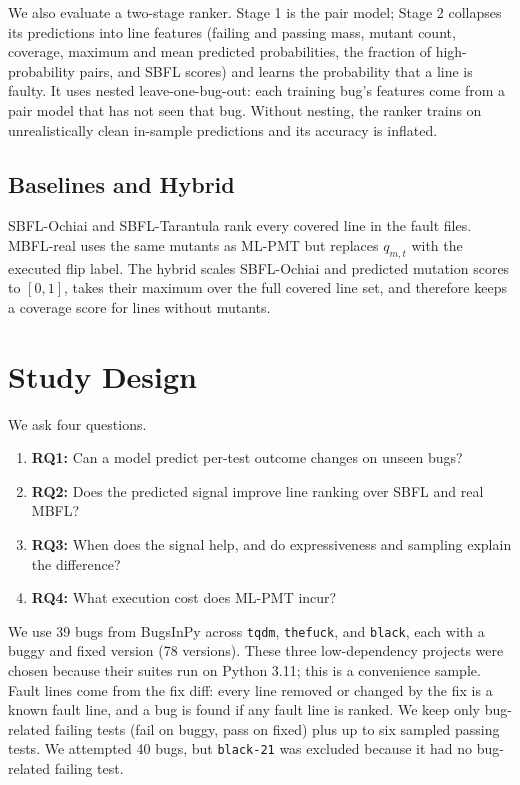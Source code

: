 \documentclass[10pt,conference]{IEEEtran}
\begin{document}
We also evaluate a two-stage ranker. Stage 1 is the pair model; Stage 2 collapses its predictions into line features (failing and passing mass, mutant count, coverage, maximum and mean predicted probabilities, the fraction of high-probability pairs, and SBFL scores) and learns the probability that a line is faulty. It uses nested leave-one-bug-out: each training bug's features come from a pair model that has not seen that bug. Without nesting, the ranker trains on unrealistically clean in-sample predictions and its accuracy is inflated.

\subsection{Baselines and Hybrid}

SBFL-Ochiai and SBFL-Tarantula rank every covered line in the fault files. MBFL-real uses the same mutants as ML-PMT but replaces $q_{m,t}$ with the executed flip label. The hybrid scales SBFL-Ochiai and predicted mutation scores to $[0,1]$, takes their maximum over the full covered line set, and therefore keeps a coverage score for lines without mutants.

\section{Study Design}

We ask four questions.
\begin{enumerate}
    \item \textbf{RQ1:} Can a model predict per-test outcome changes on unseen bugs?
    \item \textbf{RQ2:} Does the predicted signal improve line ranking over SBFL and real MBFL? 
    \item \textbf{RQ3:} When does the signal help, and do expressiveness and sampling explain the difference?
    \item \textbf{RQ4:} What execution cost does ML-PMT incur?
\end{enumerate}

We use 39 bugs from BugsInPy \cite{b11} across \texttt{tqdm}, \texttt{thefuck}, and \texttt{black}, each with a buggy and fixed version (78 versions). These three low-dependency projects were chosen because their suites run on Python 3.11; this is a convenience sample. Fault lines come from the fix diff: every line removed or changed by the fix is a known fault line, and a bug is found if any fault line is ranked. We keep only bug-related failing tests (fail on buggy, pass on fixed) plus up to six sampled passing tests. We attempted 40 bugs, but \texttt{black-21} was excluded because it had no bug-related failing test.
\end{document}
